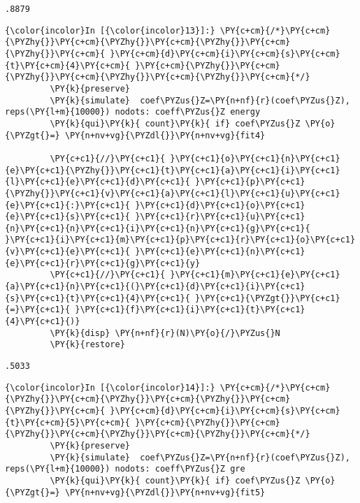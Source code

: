 \documentclass[11pt,notitlepage]{article}\usepackage[]{graphicx}\usepackage[]{color}
\makeatletter
\newenvironment{kframe}{%
 \def\at@end@of@kframe{}%
 \ifinner\ifhmode%
  \def\at@end@of@kframe{\end{minipage}}%
  \begin{minipage}{\columnwidth}%
 \fi\fi%
 \def\FrameCommand##1{\hskip\@totalleftmargin \hskip-\fboxsep
 \colorbox{shadecolor}{##1}\hskip-\fboxsep
     \hskip-\linewidth \hskip-\@totalleftmargin \hskip\columnwidth}%
 \MakeFramed {\advance\hsize-\width
   \@totalleftmargin\z@ \linewidth\hsize
   \@setminipage}}%
 {\par\unskip\endMakeFramed%
 \at@end@of@kframe}
\newenvironment{knitrout}{}{} %
\makeatother
\begin{document}
\begin{enumerate}[a)]
\begin{knitrout}
\begin{kframe}
    \begin{Verbatim}[commandchars=\\\{\}]
.8879
    \end{Verbatim}

    \begin{Verbatim}[commandchars=\\\{\}]
{\color{incolor}In [{\color{incolor}13}]:} \PY{c+cm}{/*}\PY{c+cm}{\PYZhy{}}\PY{c+cm}{\PYZhy{}}\PY{c+cm}{\PYZhy{}}\PY{c+cm}{\PYZhy{}}\PY{c+cm}{ }\PY{c+cm}{d}\PY{c+cm}{i}\PY{c+cm}{s}\PY{c+cm}{t}\PY{c+cm}{4}\PY{c+cm}{ }\PY{c+cm}{\PYZhy{}}\PY{c+cm}{\PYZhy{}}\PY{c+cm}{\PYZhy{}}\PY{c+cm}{\PYZhy{}}\PY{c+cm}{*/}
         \PY{k}{preserve}	
         \PY{k}{simulate}  coef\PYZus{}Z=\PY{n+nf}{r}(coef\PYZus{}Z), reps(\PY{l+m}{10000}) nodots: coeff\PYZus{}Z energy 
         \PY{k}{qui}\PY{k}{ count}\PY{k}{ if} coef\PYZus{}Z \PY{o}{\PYZgt{}=} \PY{n+nv+vg}{\PYZdl{}}\PY{n+nv+vg}{fit4}
         
         \PY{c+c1}{//}\PY{c+c1}{ }\PY{c+c1}{o}\PY{c+c1}{n}\PY{c+c1}{e}\PY{c+c1}{\PYZhy{}}\PY{c+c1}{t}\PY{c+c1}{a}\PY{c+c1}{i}\PY{c+c1}{l}\PY{c+c1}{e}\PY{c+c1}{d}\PY{c+c1}{ }\PY{c+c1}{p}\PY{c+c1}{\PYZhy{}}\PY{c+c1}{v}\PY{c+c1}{a}\PY{c+c1}{l}\PY{c+c1}{u}\PY{c+c1}{e}\PY{c+c1}{:}\PY{c+c1}{ }\PY{c+c1}{d}\PY{c+c1}{o}\PY{c+c1}{e}\PY{c+c1}{s}\PY{c+c1}{ }\PY{c+c1}{r}\PY{c+c1}{u}\PY{c+c1}{n}\PY{c+c1}{n}\PY{c+c1}{i}\PY{c+c1}{n}\PY{c+c1}{g}\PY{c+c1}{ }\PY{c+c1}{i}\PY{c+c1}{m}\PY{c+c1}{p}\PY{c+c1}{r}\PY{c+c1}{o}\PY{c+c1}{v}\PY{c+c1}{e}\PY{c+c1}{ }\PY{c+c1}{e}\PY{c+c1}{n}\PY{c+c1}{e}\PY{c+c1}{r}\PY{c+c1}{g}\PY{c+c1}{y}
         \PY{c+c1}{//}\PY{c+c1}{ }\PY{c+c1}{m}\PY{c+c1}{e}\PY{c+c1}{a}\PY{c+c1}{n}\PY{c+c1}{(}\PY{c+c1}{d}\PY{c+c1}{i}\PY{c+c1}{s}\PY{c+c1}{t}\PY{c+c1}{4}\PY{c+c1}{ }\PY{c+c1}{\PYZgt{}}\PY{c+c1}{=}\PY{c+c1}{ }\PY{c+c1}{f}\PY{c+c1}{i}\PY{c+c1}{t}\PY{c+c1}{4}\PY{c+c1}{)}
         \PY{k}{disp} \PY{n+nf}{r}(N)\PY{o}{/}\PYZus{}N
         \PY{k}{restore}
\end{Verbatim}

    \begin{Verbatim}[commandchars=\\\{\}]
.5033
    \end{Verbatim}

    \begin{Verbatim}[commandchars=\\\{\}]
{\color{incolor}In [{\color{incolor}14}]:} \PY{c+cm}{/*}\PY{c+cm}{\PYZhy{}}\PY{c+cm}{\PYZhy{}}\PY{c+cm}{\PYZhy{}}\PY{c+cm}{\PYZhy{}}\PY{c+cm}{ }\PY{c+cm}{d}\PY{c+cm}{i}\PY{c+cm}{s}\PY{c+cm}{t}\PY{c+cm}{5}\PY{c+cm}{ }\PY{c+cm}{\PYZhy{}}\PY{c+cm}{\PYZhy{}}\PY{c+cm}{\PYZhy{}}\PY{c+cm}{\PYZhy{}}\PY{c+cm}{*/}
         \PY{k}{preserve}	
         \PY{k}{simulate}  coef\PYZus{}Z=\PY{n+nf}{r}(coef\PYZus{}Z), reps(\PY{l+m}{10000}) nodots: coeff\PYZus{}Z gre 
         \PY{k}{qui}\PY{k}{ count}\PY{k}{ if} coef\PYZus{}Z \PY{o}{\PYZgt{}=} \PY{n+nv+vg}{\PYZdl{}}\PY{n+nv+vg}{fit5}
         

\end{Verbatim}
\end{kframe}
\end{knitrout}
\end{enumerate}
\end{document}
